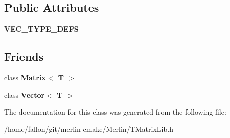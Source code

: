 \subsection*{Public Attributes}
\begin{DoxyCompactItemize}
\item 
\mbox{\label{classTLAS_1_1SubVector_a6164243f8fd68e9234bb7e7787265238}} 
{\bfseries V\+E\+C\+\_\+\+T\+Y\+P\+E\+\_\+\+D\+E\+FS}
\end{DoxyCompactItemize}
\subsection*{Friends}
\begin{DoxyCompactItemize}
\item 
\mbox{\label{classTLAS_1_1SubVector_a17fc06682c9f9c46f1e0e38b7af25b80}} 
class {\bfseries Matrix$<$ T $>$}
\item 
\mbox{\label{classTLAS_1_1SubVector_a07857ea092bfd5d08a811e05ad544204}} 
class {\bfseries Vector$<$ T $>$}
\end{DoxyCompactItemize}


The documentation for this class was generated from the following file\+:\begin{DoxyCompactItemize}
\item 
/home/fallon/git/merlin-\/cmake/\+Merlin/T\+Matrix\+Lib.\+h\end{DoxyCompactItemize}
